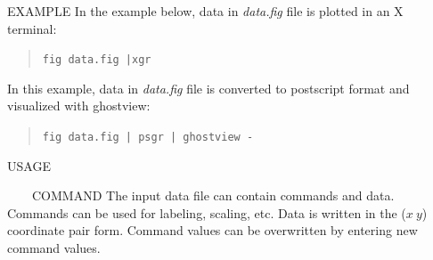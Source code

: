 \begin{qsection}{EXAMPLE}
In the example below, data in {\em data.fig} file is plotted in an X terminal:
\vspace{-3mm}
\begin{quote}
 \verb!fig data.fig |xgr!
\end{quote}
\vspace{-3mm}
In this example, data in {\em data.fig} file is converted to postscript format
and visualized with ghostview:
\vspace{-3mm}
\begin{quote}
 \verb!fig data.fig | psgr | ghostview -!
\end{quote}
\vspace{-3mm}
\end{qsection}

\vspace{-1cm}
\begin{qsection}{USAGE}
~\vspace{-1cm}
\end{qsection}

\begin{qsection}{\ ~~~COMMAND}
The input data file can contain commands and data.
Commands can be used for labeling, scaling, etc.
Data is written in the ($x ~y$) coordinate pair form.
Command values can be overwritten by entering new command values.
\end{qsection}

